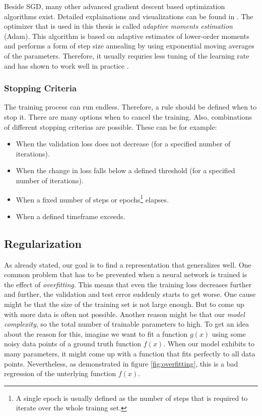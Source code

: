 Beside SGD, many other advanced gradient descent based optimization algorithms exist. Detailed explainations and visualizations can be found in \parencite{optimization}. The optimizer that is used in this thesis is called \textit{adaptive moments estimation} (Adam). This algorithm is based on adaptive estimates of lower-order moments and performs a form of step size annealing by using exponential moving averages of the parameters. Therefore, it usually requries less tuning of the learning rate and has shown to work well in practice \parencite{adam}.


\subsubsection{Stopping Criteria}

The training process can run endless. Therefore, a rule should be defined when to stop it. There are many options when to cancel the training. Also, combinations of different stopping criterias are possible. These can be for example:

\begin{itemize}
\item When the validation loss does not decrease (for a specified number of iterations).
\item When the change in loss falls below a defined threshold (for a specified number of iterations).
\item When a fixed number of steps or epochs\footnote{A single epoch is usually defined as the number of steps that is required to iterate over the whole trainng set.} elapses.
\item When a defined timeframe exceeds.
\end{itemize}


\subsection{Regularization}

As already stated, our goal is to find a representation that generalizes well. One common problem that has to be prevented when a neural network is trained is the effect of \textit{overfitting}. This means that even the training loss decreases further and further, the validation and test error suddenly starts to get worse. One cause might be that the size of the training set is not large enough. But to come up with more data is often not possible. Another reason might be that our \textit{model complexity}, so the total number of trainable parameters to high. To get an idea about the reason for this, imagine we want to fit a function $g(x)$ using some noisy data points of a ground truth function $f(x)$. When our model exhibits to many parameters, it might come up with a function that fits perfectly to all data points. Nevertheless, as demonstrated in figure \ref{fig:overfitting}, this is a bad regression of the unterlying function $f(x)$.

